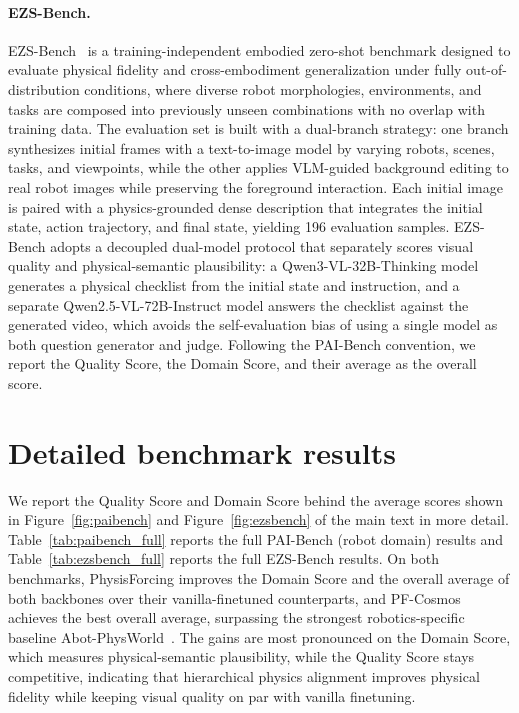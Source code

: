 \documentclass{llmxive}
\begin{document}
\paragraph{EZS-Bench.}
EZS-Bench~\cite{ali2025abot} is a training-independent embodied zero-shot benchmark
designed to evaluate physical fidelity and cross-embodiment generalization under fully
out-of-distribution conditions, where diverse robot morphologies, environments, and tasks
are composed into previously unseen combinations with no overlap with training data. The
evaluation set is built with a dual-branch strategy: one branch synthesizes initial frames
with a text-to-image model by varying robots, scenes, tasks, and viewpoints, while the
other applies VLM-guided background editing to real robot images while preserving the
foreground interaction. Each initial image is paired with a physics-grounded dense
description that integrates the initial state, action trajectory, and final state, yielding
196 evaluation samples. EZS-Bench adopts a decoupled dual-model protocol that separately
scores visual quality and physical-semantic plausibility: a Qwen3-VL-32B-Thinking model
generates a physical checklist from the initial state and instruction, and a separate
Qwen2.5-VL-72B-Instruct model answers the checklist against the generated video, which
avoids the self-evaluation bias of using a single model as both question generator and
judge. Following the PAI-Bench convention, we report the Quality Score, the Domain Score,
and their average as the overall score.

\section{Detailed benchmark results}
\label{appx:bench_results}

We report the Quality Score and Domain Score behind the average scores shown in
Figure~\ref{fig:paibench} and Figure~\ref{fig:ezsbench} of the main text in more detail.
Table~\ref{tab:paibench_full} reports the full PAI-Bench (robot domain) results and
Table~\ref{tab:ezsbench_full} reports the full EZS-Bench results. On both benchmarks, PhysisForcing improves the Domain Score and the
overall average of both backbones over their vanilla-finetuned counterparts, and
PF-Cosmos achieves the best overall average, surpassing the
strongest robotics-specific baseline Abot-PhysWorld~\cite{ali2025abot}. The gains are most
pronounced on the Domain Score, which measures physical-semantic plausibility, while the
Quality Score stays competitive, indicating that hierarchical physics alignment improves
physical fidelity while keeping visual quality on par with vanilla finetuning.
\end{document}
